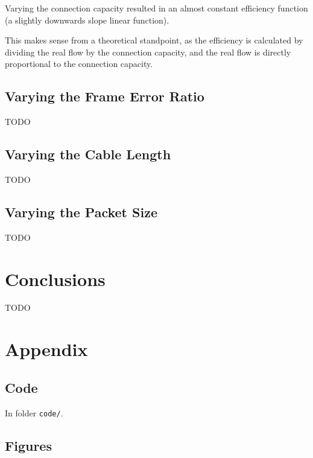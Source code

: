 \documentclass[11pt,a4paper,twocolumn]{article}
\begin{document}
Varying the connection capacity resulted in an almost constant efficiency function (a slightly downwards slope linear function).

This makes sense from a theoretical standpoint, as the efficiency is calculated by dividing the real flow by the connection capacity, and the real flow is directly proportional to the connection capacity.

\subsection{Varying the Frame Error Ratio}

TODO

\subsection{Varying the Cable Length}

TODO

\subsection{Varying the Packet Size}

TODO

\section{Conclusions}

TODO

\onecolumn
\appendix
\section{Appendix}

\subsection{Code}

\noindent In folder \lstinline{code/}.

\subsection{Figures}
\label{sec:a2}

\end{document}
